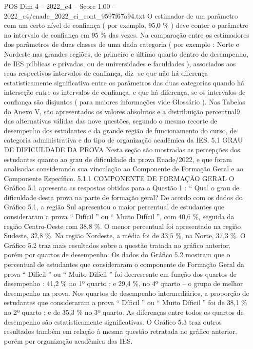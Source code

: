 \begin{textsample}{POS Dim 4 – 2022\_c4 – Score 1.00 – 2022\_c4/enade\_2022\_ci\_cont\_9597f67a94.txt}
O estimador de um parâmetro com um certo nível de confiança ( por exemplo, 95,0 \% ) deve conter o parâmetro no intervalo de confiança em 95 \% das vezes.
Na comparação entre os estimadores dos parâmetros de duas classes de uma dada categoria ( por exemplo : Norte e Nordeste nas grandes regiões, de primeiro e último quarto dentro de desempenho, de IES públicas e privadas, ou de universidades e faculdades ), associados aos seus respectivos intervalos de confiança, diz -se que não há diferença estatisticamente significativa entre os parâmetros das duas categorias quando há interseção entre os intervalos de confiança, e que há diferença, se os intervalos de confiança são disjuntos ( para maiores informações vide Glossário ).
Nas Tabelas do Anexo V, são apresentados os valores absolutos e a distribuição percentual9 das alternativas válidas das nove questões, segundo o mesmo recorte de desempenho dos estudantes e da grande região de funcionamento do curso, de categoria administrativa e do tipo de organização acadêmica da IES. 5.1 GRAU DE DIFICULDADE DA PROVA Nesta seção são mostradas as percepções dos estudantes quanto ao grau de dificuldade da prova Enade/2022, e que foram analisadas considerando sua vinculação ao Componente de Formação Geral e ao Componente Específico. 5.1.1 COMPONENTE DE FORMAÇÃO GERAL O Gráfico 5.1 apresenta as respostas obtidas para a Questão 1 : “ Qual o grau de dificuldade desta prova na parte de formação geral?
De acordo com os dados do Gráfico 5.1, a região Sul apresentou o maior percentual de estudantes que consideraram a prova “ Difícil ” ou “ Muito Difícil ”, com 40,6 \%, seguida da região Centro-Oeste com 38,8 \%.
O menor percentual foi apresentado na região Sudeste, 32,8 \%.
Na região Nordeste, a média foi de 33,5 \%, na Norte, 37,3 \%.
O Gráfico 5.2 traz mais resultados sobre a questão tratada no gráfico anterior, porém por quartos de desempenho.
Os dados do Gráfico 5.2 mostram que o percentual de estudantes que consideraram o componente de Formação Geral da prova “ Difícil ” ou “ Muito Difícil ” foi decrescente em função dos quartos de desempenho : 41,2 \% no 1º quarto ; e 29,4 \%, no 4º quarto – o grupo de melhor desempenho na prova.
Nos quartos de desempenho intermediários, a proporção de estudantes que consideraram a prova “ Díficil ” ou “ Muito Díficil ” foi de 38,1 \% no 2º quarto ; e de 35,3 \% no 3º quarto.
As diferenças entre todos os quartos de desempenho são estatisticamente significativas.
O Gráfico 5.3 traz outros resultados também em relação à mesma questão retratada no gráfico anterior, porém por organização acadêmica das IES.

\end{textsample}
